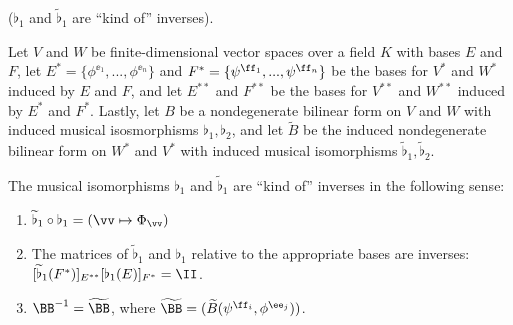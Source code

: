 \begin{theorem}
    \label{ch::bilinear_forms_metric_tensors::thm::B_Btilde_kind_of_inverses}
    ($\flat_1$ and $\widetilde{\flat}_1$ are ``kind of'' inverses).
    
    Let $V$ and $W$ be finite-dimensional vector spaces over a field $K$ with bases $E$ and $F$, let $E^* = \{\phi^{\ee_1}, ..., \phi^{\ee_n}\}$ and $F^* = \{\psi^{\ff_1}, ..., \psi^{\ff_n}\}$ be the bases for $V^*$ and $W^*$ induced by $E$ and $F$, and let $E^{**}$ and $F^{**}$ be the bases for $V^{**}$ and $W^{**}$ induced by $E^*$ and $F^*$. Lastly, let $B$ be a nondegenerate bilinear form on $V$ and $W$ with induced musical isosmorphisms $\flat_1, \flat_2$, and let $\widetilde{B}$ be the induced nondegenerate bilinear form on $W^*$ and $V^*$ with induced musical isomorphisms $\widetilde{\flat}_1, \widetilde{\flat}_2$.
    
    The musical isomorphisms $\flat_1$ and $\widetilde{\flat}_1$ are ``kind of'' inverses in the following sense:
     
    \begin{enumerate}
         \item $\widetilde{\flat}_1 \circ \flat_1 = (\vv \mapsto \Phi_\vv)$
        \item The matrices of $\widetilde{\flat}_1$ and $\flat_1$ relative to the appropriate bases are inverses: $[\widetilde{\flat}_1(F^*)]_{E^{**}} [\flat_1(E)]_{F^*} = \II$.
        \item $\BB^{-1} = \widetilde{\BB}$, where $\widetilde{\BB} = (\widetilde{B}(\psi^{\ff_i}, \phi^{\ee_j}))$.
    \end{enumerate}
\end{theorem}
 

